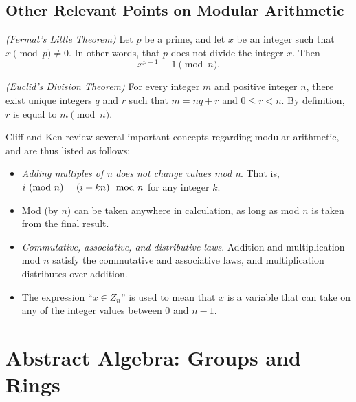 \subsection{Other Relevant Points on Modular Arithmetic}

\begin{theorem}
\emph{(Fermat's Little Theorem)}
Let $p$ be a prime, and let $x$ be an integer such that $x \pmod p \ne 0$. In other words, that $p$ does not divide the integer $x$. Then
\begin{equation}
x^{p-1} \equiv 1 \pmod{n}.
\end{equation}
\end{theorem}

\begin{theorem}
\emph{(Euclid's Division Theorem)} For every integer $m$ and positive integer $n$, there exist unique integers $q$ and $r$ such that $m=nq+r$ and $0 \leq r < n$. By definition, $r$ is equal to $m \pmod n$.
\end{theorem}

Cliff and Ken \cite{cs21math19notes} review several important concepts regarding modular arithmetic, and are thus listed as follows:

\begin{itemize}
\item \textit{Adding multiples of n does not change values mod n}. That is, \\ $i \ (\text{mod}\ n) = (i+kn) \mod n$ for any integer $k$.

\item Mod (by $n$) can be taken anywhere in calculation, as long as mod $n$ is taken from the final result.

\item \textit{Commutative, associative, and distributive laws}. Addition and multiplication mod $n$ satisfy the commutative and associative laws, and multiplication distributes over addition.

\item The expression ``$x \in Z_{n}$'' is used to mean that $x$ is a variable that can take on any of the integer values between 0 and $n-1$.
\end{itemize}

\section{Abstract Algebra: Groups and Rings}

